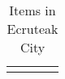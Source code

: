 \begin{longtable}{|| l l l l ||}%
\hline%
\endhead%
\hline%
\caption{Items in Ecruteak City}%
\label{tab:EcruteakCityItems}%
\end{longtable}
